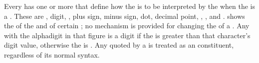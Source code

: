 Every  has one or more 
that define how the  is to be interpreted by the 
when the  is a  .
These  are 
     ,                  
     digit,
     ,
     plus sign,
     minus sign, 
     dot,
     decimal point,
     ,
     ,
 and .
 shows the 
of the 
and of certain  ;
no mechanism is provided for changing the  of a .
Any  with the alphadigit 
in that figure is a digit if the  is greater
than that character's digit value,
otherwise the  is .  
Any  quoted by a  
is treated as an  constituent, regardless of its normal syntax.

\def\a{\term{alphabetic}\meaning{2}}
\def\ad{alphadigit}
\def\i{\term{invalid}}
\def\pm{\term{package marker}}

